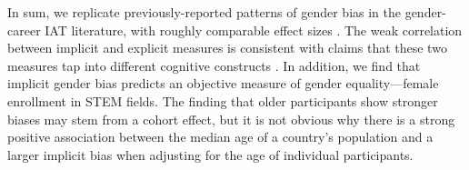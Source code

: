 \documentclass[9pt,twocolumn,twoside,lineno]{pnas-new}
\begin{document}



In sum, we replicate previously-reported patterns of gender bias in the
gender-career IAT literature, with roughly comparable effect sizes \citep[c.f.][]{nosek2002harvesting}.
The weak correlation between implicit and
explicit measures is consistent with claims that these two measures tap
into different cognitive constructs \cite{forscher2016meta}. In
addition, we find that implicit gender bias predicts an objective measure of gender equality---female enrollment in STEM fields. The
finding that older participants show stronger biases may stem from a
cohort effect, but it is not obvious why there is a strong positive
association between the median age of a country's population and a
larger implicit bias when adjusting for the age of individual
participants.
\end{document}
